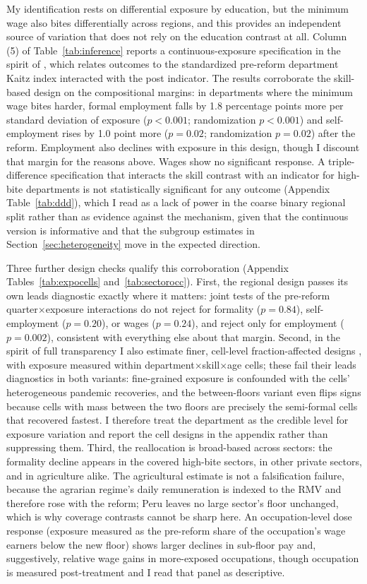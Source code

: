 My identification rests on differential exposure by education, but the minimum wage also
bites differentially across regions, and this provides an independent source of
variation that does not rely on the education contrast at all. Column (5) of
Table~\ref{tab:inference} reports a continuous-exposure specification in the spirit of
\citet{card_1992}, which relates outcomes to the standardized pre-reform department
Kaitz index interacted with the post indicator. The results corroborate the skill-based
design on the compositional margins: in departments where the minimum wage bites harder,
formal employment falls by 1.8 percentage points more per standard deviation of exposure
($p<0.001$; randomization $p<0.001$) and self-employment rises by 1.0 point more
($p=0.02$; randomization $p=0.02$) after the reform. Employment also declines with
exposure in this design, though I discount that margin for the reasons above. Wages show
no significant response. A triple-difference specification that interacts the skill
contrast with an indicator for high-bite departments is not statistically significant
for any outcome (Appendix Table~\ref{tab:ddd}), which I read as a lack of power in the
coarse binary regional split rather than as evidence against the mechanism, given that
the continuous version is informative and that the subgroup estimates in
Section~\ref{sec:heterogeneity} move in the expected direction.

Three further design checks qualify this corroboration (Appendix
Tables~\ref{tab:expocells} and~\ref{tab:sectorocc}). First, the regional design passes
its own leads diagnostic exactly where it matters: joint tests of the pre-reform
quarter$\times$exposure interactions do not reject for formality ($p=0.84$),
self-employment ($p=0.20$), or wages ($p=0.24$), and reject only for employment
($p=0.002$), consistent with everything else about that margin. Second, in the spirit
of full transparency I also estimate finer, cell-level fraction-affected designs
\citep{card_1992, clemens_wither_2019}, with exposure measured within
department$\times$skill$\times$age cells; these fail their leads diagnostics in both
variants: fine-grained exposure is confounded with the cells' heterogeneous pandemic
recoveries, and the between-floors variant even flips signs because cells with mass
between the two floors are precisely the semi-formal cells that recovered fastest. I
therefore treat the department as the credible level for exposure variation and
report the cell designs in the appendix rather than suppressing them. Third, the
reallocation is broad-based across sectors: the formality decline appears in the
covered high-bite sectors, in other private sectors, and in agriculture alike. The
agricultural estimate is not a falsification failure, because the agrarian regime's
daily remuneration is indexed to the RMV and therefore rose with the reform;
Peru leaves no large sector's floor unchanged, which is why coverage contrasts cannot
be sharp here. An occupation-level dose response (exposure measured as the pre-reform
share of the occupation's wage earners below the new floor) shows larger declines in
sub-floor pay and, suggestively, relative wage gains in more-exposed occupations,
though occupation is measured post-treatment and I read that panel as descriptive.

